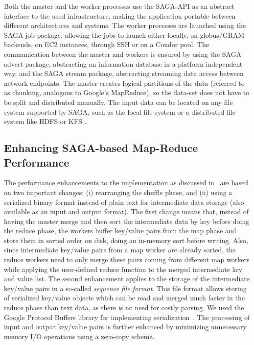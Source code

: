 \documentclass[3p,twocolumn]{elsarticle}
\begin{document}
Both the master and the worker processes use the SAGA-API as an
abstract interface to the used infrastructure, making the application
portable between different architectures and systems.  The worker
processes are launched using the SAGA job package, allowing the jobs
to launch either locally, on globus/GRAM backends, on EC2 instances, through SSH
or on a Condor pool. The communication between the master and workers
is ensured by using the SAGA advert package, abstracting an
information database in a platform independent way, and the SAGA stream
package, abstracting streaming data access between network endpoints.
The master creates logical partitions of the data (referred to as chunking,
analogous to Google's MapReduce), so the data-set does not have to be split
and distributed manually.  The input data can be located on any file system
supported by SAGA, such as the local file system or a distributed file system
like HDFS or KFS \cite{KFS}.


\subsection{Enhancing SAGA-based Map-Reduce Performance}

The performance enhancements to the \sagamapreduce implementation as
discussed in~\cite{saga_ccgrid09} are based on two important changes:
(i) rearranging the shuffle phase, and (ii) using a serialized binary
format instead of plain text for intermediate data storage (also
available as an input and output format).  The first change means
that, instead of having the master merge and then sort the
intermediate data by key before doing the reduce phase, the workers
buffer key/value pairs from the map phase and store them in sorted
order on disk, doing an in-memory sort before writing. Also, since
intermediate key/value pairs from a map worker are already sorted, the
reduce workers need to only merge these pairs coming from different
map workers while applying the user-defined reduce function to the
merged intermediate key and value list.  The second enhancement
applies to the storage of the intermediate key/value pairs in a
so-called \emph{sequence file format}. This file format allows storing
of serialized key/value objects which can be read and merged much
faster in the reduce phase than text data, as there is no need for
costly parsing.  We used the Google Protocol Buffers library for
implementing serialization~\cite{protobuf}.  The processing of input
and output key/value pairs is further enhanced by minimizing
unnecessary memory I/O operations using a zero-copy scheme.
\end{document}
